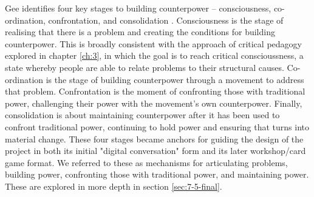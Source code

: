 Gee identifies four key stages to building counterpower – consciousness, co-ordination, confrontation, and consolidation \citep[p. 130]{gee_counterpower:_2011}. Consciousness is the stage of realising that there is a problem and creating the conditions for building counterpower. This is broadly consistent with the approach of critical pedagogy explored in chapter \ref{ch:3}, in which the goal is to reach critical conscioussness,  a state whereby people are able to relate problems to their structural causes. Co-ordination is the stage of building counterpower through a movement to address that problem. Confrontation is the moment of confronting those with traditional power, challenging their power with the movement’s own counterpower. Finally, consolidation is about maintaining counterpower after it has been used to confront traditional power, continuing to hold power and ensuring that turns into material change. These four stages became anchors for guiding the design of the project in both its initial "digital conversation" form and its later workshop/card game format. We referred to these as mechanisms for articulating problems, building power, confronting those with traditional power, and maintaining power. These are explored in more depth in section \ref{sec:7-5-final}. 

